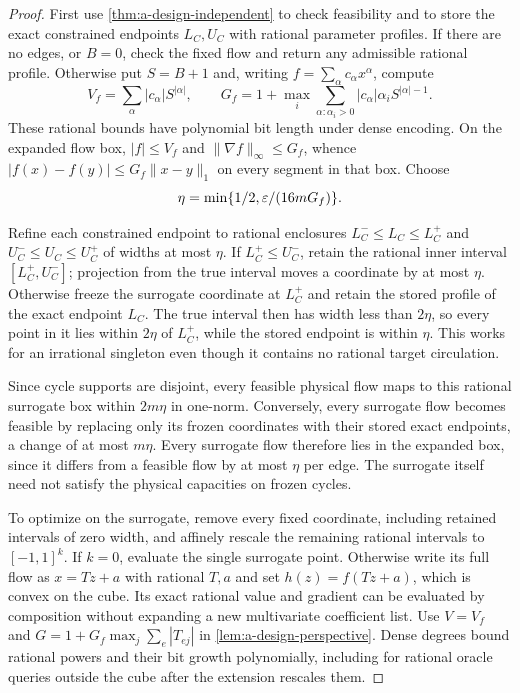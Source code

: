 \begin{proof}
First use \cref{thm:a-design-independent} to check feasibility and to
store the exact constrained endpoints $L_C,U_C$ with rational parameter
profiles.  If there are no edges, or $B=0$, check the fixed flow and
return any admissible rational profile.  Otherwise put $S=B+1$ and,
writing $f=\sum_\alpha c_\alpha x^\alpha$, compute
\[
 V_f=\sum_\alpha|c_\alpha|S^{|\alpha|},\qquad
 G_f=1+\max_i\sum_{\alpha:\alpha_i>0}
                    |c_\alpha|\alpha_i S^{|\alpha|-1}.
\]
These rational bounds have polynomial bit length under dense
encoding.  On the expanded flow box, $|f|\le V_f$ and
$\|\nabla f\|_\infty\le G_f$, whence
$|f(x)-f(y)|\le G_f\|x-y\|_1$ on every segment in that box.
Choose
\[
 \eta=\min\{1/2,\varepsilon/(16mG_f)\}.
\]

Refine each constrained endpoint to rational enclosures
$L_C^-\le L_C\le L_C^+$ and $U_C^-\le U_C\le U_C^+$ of widths
at most $\eta$.  If $L_C^+\le U_C^-$, retain the rational inner
interval $[L_C^+,U_C^-]$; projection from the true interval moves a
coordinate by at most $\eta$.  Otherwise freeze the surrogate
coordinate at $L_C^+$ and retain the stored profile of the exact
endpoint $L_C$.  The true interval then has width less than
$2\eta$, so every point in it lies within $2\eta$ of $L_C^+$, while
the stored endpoint is within $\eta$.  This works for an irrational
singleton even though it contains no rational target circulation.

Since cycle supports are disjoint, every feasible physical flow maps
to this rational surrogate box within $2m\eta$ in one-norm.
Conversely, every surrogate flow becomes feasible by replacing only
its frozen coordinates with their stored exact endpoints, a change
of at most $m\eta$.  Every surrogate flow therefore lies in the
expanded box, since it differs from a feasible flow by at most
$\eta$ per edge.  The surrogate itself need not satisfy the physical
capacities on frozen cycles.

To optimize on the surrogate, remove every fixed coordinate,
including retained intervals of zero width, and affinely rescale the
remaining rational intervals to $[-1,1]^k$.  If $k=0$, evaluate the
single surrogate point.  Otherwise write its full flow as $x=Tz+a$
with rational $T,a$ and set $h(z)=f(Tz+a)$, which is convex on the
cube.  Its exact rational value and gradient can be evaluated by
composition without expanding a new multivariate coefficient list.
Use $V=V_f$ and
$G=1+G_f\max_j\sum_e|T_{ej}|$ in
\cref{lem:a-design-perspective}.  Dense degrees bound rational powers
and their bit growth polynomially, including for rational oracle
queries outside the cube after the extension rescales them.


\end{proof}
